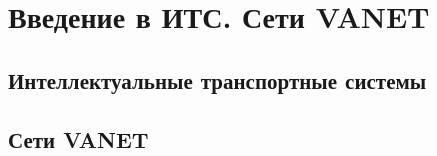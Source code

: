 \chapter{Введение в ИТС. Сети VANET}

\section{Интеллектуальные транспортные системы}



\section{Сети VANET}



